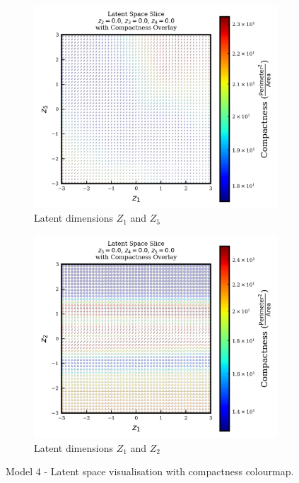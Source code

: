 \documentclass{article}
\begin{document}
\begin{figure}[H]
  \vspace{0.5em}

  \begin{subfigure}{0.48\textwidth}
    \centering
    \includegraphics[width=\textwidth]{figures/VAEmodels/model4/varying_z1_z5_fixed_z2=0.0_z3=0.0_z4=0.0.png}
    \caption{Latent dimensions $Z_1$ and $Z_5$}
    \label{fig:model4_z1_z5}
  \end{subfigure}
  \hfill
  \begin{subfigure}{0.48\textwidth}
    \centering
    \includegraphics[width=\textwidth]{figures/VAEmodels/model4/varying_z1_z2_fixed_z3=0.0_z4=0.0_z5=0.0.png}
    \caption{Latent dimensions $Z_1$ and $Z_2$}
    \label{fig:model4_z1_z2}
  \end{subfigure}

  \caption{Model 4 - Latent space visualisation with compactness colourmap.}
  \label{fig:model4_latent_visualisations}
\end{figure}
\end{document}
